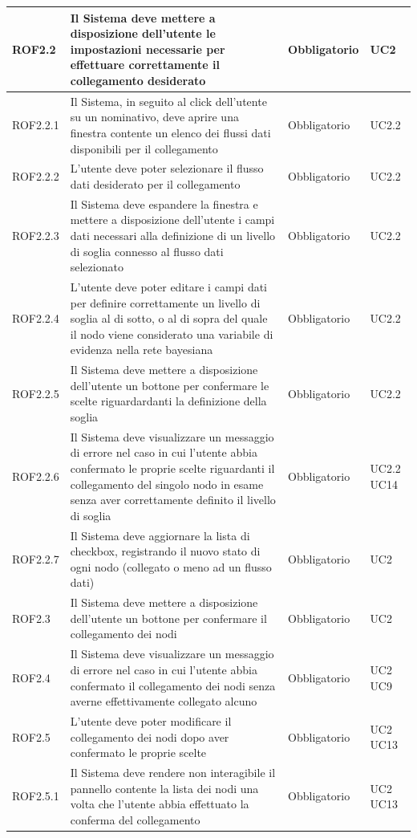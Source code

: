 \begin{center}
\begin{longtable}[c]{|m{}|m{}|m{}|m{}|}
\hline
\rowcolor{grigio}ROF2.2 & Il Sistema deve mettere a disposizione dell'utente le impostazioni necessarie per effettuare correttamente il collegamento desiderato & Obbligatorio & UC2\\
\hline
ROF2.2.1 & Il Sistema, in seguito al click dell'utente su un nominativo, deve aprire una finestra contente un elenco dei flussi dati disponibili per il collegamento & Obbligatorio & UC2.2\\
\hline
\rowcolor{grigio}ROF2.2.2 & L'utente deve poter selezionare il flusso dati desiderato per il collegamento & Obbligatorio & UC2.2\\
\hline
ROF2.2.3 & Il Sistema deve espandere la finestra e mettere a disposizione dell'utente i campi dati necessari alla definizione di un livello di soglia connesso al flusso dati selezionato & Obbligatorio & UC2.2\\
\hline
\rowcolor{grigio}ROF2.2.4 & L'utente deve poter editare i campi dati per definire correttamente un livello di soglia al di sotto, o al di sopra del quale il nodo viene considerato una variabile di evidenza nella rete bayesiana & Obbligatorio & UC2.2\\
\hline
ROF2.2.5 & Il Sistema deve mettere a disposizione dell'utente un bottone per confermare le scelte riguardardanti la definizione della soglia & Obbligatorio & UC2.2\\
\hline
\rowcolor{grigio}ROF2.2.6 & Il Sistema deve visualizzare un messaggio di errore nel caso in cui l'utente abbia confermato le proprie scelte riguardanti il collegamento del singolo nodo in esame senza aver correttamente definito il livello di soglia & Obbligatorio & UC2.2 UC14\\
\hline
ROF2.2.7 & Il Sistema deve aggiornare la lista di checkbox, registrando il nuovo stato di ogni nodo (collegato o meno ad un flusso dati) & Obbligatorio & UC2\\
\hline
\rowcolor{grigio}ROF2.3 & Il Sistema deve mettere a disposizione dell'utente un bottone per confermare il collegamento dei nodi & Obbligatorio & UC2\\
\hline
ROF2.4 & Il Sistema deve visualizzare un messaggio di errore nel caso in cui l'utente abbia confermato il collegamento dei nodi senza averne effettivamente collegato alcuno & Obbligatorio & UC2 UC9\\
\hline
\rowcolor{grigio}ROF2.5 & L'utente deve poter modificare il collegamento dei nodi dopo aver confermato le proprie scelte & Obbligatorio & UC2 UC13\\
\hline
ROF2.5.1 & Il Sistema deve rendere non interagibile il pannello contente la lista dei nodi una volta che l'utente abbia effettuato la conferma del collegamento & Obbligatorio & UC2 UC13\\

\end{longtable}
\end{center}

